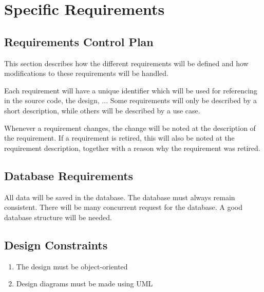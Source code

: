 \chapter{Specific Requirements}

\section{Requirements Control Plan}

	This section describes how the different requirements will be defined and how 
	modifications to these requirements will be handled.
	
	Each requirement will have a unique identifier which will be used for referencing 
	in the source code, the design, ... Some requirements will only be described by
	a short description, while others will be described by a use case.
	
	Whenever a requirement changes, the change will be noted at the description of 
	the requirement. If a requirement is retired, this will also be noted at the
	requirement description, together with a reason why the requirement was retired.






\section{Database Requirements}
	All data will be saved in the database. The database must always remain consistent. There will be many concurrent request 
	for the database. A good database structure will be needed. 
\section{Design Constraints}
	\begin{enumerate}
		\item The design must be object-oriented
		\item Design diagrams must be made using UML
	\end{enumerate}
